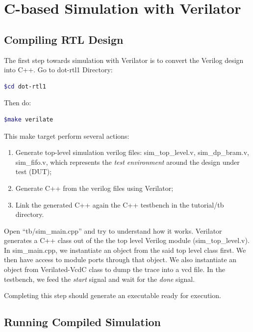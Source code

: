 \documentclass[12pt]{article}
\begin{document}
\section{C-based Simulation with Verilator}

\subsection{Compiling RTL Design}

The first step towards simulation with Verilator is to convert the
Verilog design into C++. Go to dot-rtl1 Directory:

\begin{lstlisting}[language=bash]
$cd dot-rtl1
\end{lstlisting}

Then do:

\begin{lstlisting}[language=bash]
$make verilate
\end{lstlisting}

This make target perform several actions:

\begin{enumerate}
\item Generate top-level simulation verilog files:
  sim\_top\_level.v, sim\_dp\_bram.v, sim\_fifo.v, which
  represents the {\em test environment} around the design
  under test (DUT);

\item Generate C++ from the verilog files using Verilator;

\item Link the generated C++ again the C++ testbench in
  the tutorial/tb directory. 
  
\end{enumerate}

Open “tb/sim\_main.cpp” and try to understand how it works.  Verilator
generates a C++ class out of the the top level Verilog module
(sim\_top\_level.v).  In sim\_main.cpp, we instantiate an object from
the said top level class first. We then have access to module ports
through that object. We also instantiate an object from Verilated-VcdC
class to dump the trace into a vcd file. In the testbench, we feed the
{\em start} signal and wait for the {\em done} signal.

Completing this step should generate an executable ready for execution.

\subsection{Running Compiled Simulation}
\end{document}
